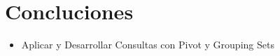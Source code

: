 \section{Concluciones} 

\begin{itemize}
	\item Aplicar y Desarrollar  Consultas con Pivot y Grouping Sets



\end{itemize}